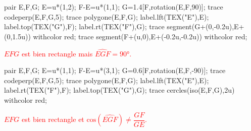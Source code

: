     \begin{minipage}{0.45\linewidth}
        \begin{Geometrie}
            pair E,F,G;
            E=u*(1,2);
            F-E=u*(1,1);
            G=1.4[F,rotation(E,F,90)];
            trace codeperp(E,F,G,5);
            trace polygone(E,F,G);
            label.lft(TEX("E"),E);
            label.top(TEX("G"),F);
            label.rt(TEX("F"),G);
            trace segment(G+(0,-0.2u),E+(0,1.5u)) withcolor red;
            trace segment(F+(u,0),E+(-0.2u,-0.2u)) withcolor red;
        \end{Geometrie}
        \textcolor{red}{$EFG$ est bien rectangle mais $\widehat{EGF}=\ang{90}$.}

        \bigskip
        \begin{Geometrie}
            pair E,F,G;
            E=u*(1,1);
            F-E=u*(3,1);
            G=0.6[F,rotation(E,F,-90)];
            trace codeperp(E,F,G,5);
            trace polygone(E,F,G);
            label.lft(TEX("E"),E);
            label.rt(TEX("F"),F);
            label.top(TEX("G"),G);
            trace cercles(iso(E,F,G),2u) withcolor red;
        \end{Geometrie}
        \textcolor{red}{$EFG$ est bien rectangle et $\text{cos}(\widehat{EGF})\neq\dfrac{GF}{GE}$.}
    \end{minipage}
